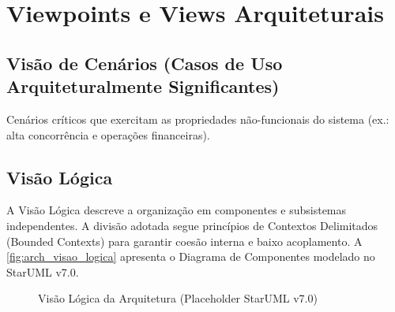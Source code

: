 \section{Viewpoints e Views Arquiteturais}

\subsection{Visão de Cenários (Casos de Uso Arquiteturalmente Significantes)}
Cenários críticos que exercitam as propriedades não-funcionais do sistema (ex.: alta concorrência e operações financeiras).

\subsection{Visão Lógica}
A Visão Lógica descreve a organização em componentes e subsistemas independentes. A divisão adotada segue princípios de Contextos Delimitados (Bounded Contexts) para garantir coesão interna e baixo acoplamento. A \autoref{fig:arch_visao_logica} apresenta o Diagrama de Componentes modelado no StarUML v7.0.

\begin{figure}[htbp]
    \centering
    \caption{Visão Lógica da Arquitetura (Placeholder StarUML v7.0)}
    \label{fig:arch_visao_logica}
\end{figure}

